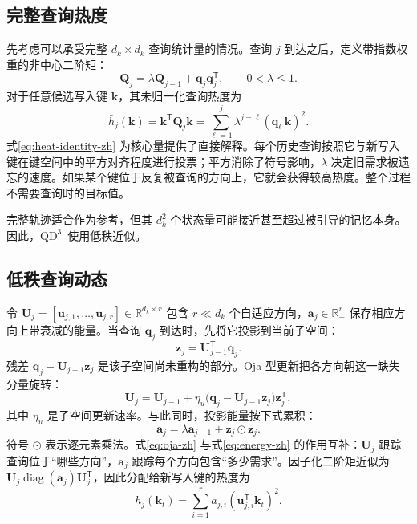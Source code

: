 \documentclass[11pt,a4paper]{ctexart}
\newcommand{\R}{\mathbb{R}}
\newcommand{\Q}{\bm{Q}}
\newcommand{\U}{\bm{U}}
\newcommand{\kvec}{\bm{k}}
\newcommand{\qvec}{\bm{q}}
\newcommand{\avec}{\bm{a}}
\newcommand{\zvec}{\bm{z}}
\newcommand{\diag}{\operatorname{diag}}
\newcommand{\QDDD}{\ensuremath{\mathrm{QD}^{3}}}
\begin{document}
\subsection{完整查询热度}

先考虑可以承受完整 $d_k\times d_k$ 查询统计量的情况。查询 $j$ 到达之后，定义带指数权重的非中心二阶矩：
\begin{equation}
 \Q_j=\lambda\Q_{j-1}+\qvec_j\qvec_j^{\mathsf T},
 \qquad 0<\lambda\leq1.
 \label{eq:full-trace-zh}
\end{equation}
对于任意候选写入键 $\kvec$，其未归一化查询热度为
\begin{equation}
 \bar h_j(\kvec)=\kvec^{\mathsf T}\Q_j\kvec
 =\sum_{\ell=1}^{j}\lambda^{j-\ell}(\qvec_{\ell}^{\mathsf T}\kvec)^2.
 \label{eq:heat-identity-zh}
\end{equation}
式\eqref{eq:heat-identity-zh} 为核心量提供了直接解释。每个历史查询按照它与新写入键在键空间中的平方对齐程度进行投票；平方消除了符号影响，$\lambda$ 决定旧需求被遗忘的速度。如果某个键位于反复被查询的方向上，它就会获得较高热度。整个过程不需要查询时的目标值。

完整轨迹适合作为参考，但其 $d_k^2$ 个状态量可能接近甚至超过被引导的记忆本身。因此，\QDDD\ 使用低秩近似。

\subsection{低秩查询动态}

令 $\U_j=[\bm u_{j,1},\ldots,\bm u_{j,r}]\in\R^{d_k\times r}$ 包含 $r\ll d_k$ 个自适应方向，$\avec_j\in\R_+^r$ 保存相应方向上带衰减的能量。当查询 $\qvec_j$ 到达时，先将它投影到当前子空间：
\begin{equation}
 \zvec_j=\U_{j-1}^{\mathsf T}\qvec_j.
 \label{eq:projection-zh}
\end{equation}
残差 $\qvec_j-\U_{j-1}\zvec_j$ 是该子空间尚未重构的部分。Oja 型更新把各方向朝这一缺失分量旋转：
\begin{equation}
 \U_j=\U_{j-1}+\eta_u
 \bigl(\qvec_j-\U_{j-1}\zvec_j\bigr)\zvec_j^{\mathsf T},
 \label{eq:oja-zh}
\end{equation}
其中 $\eta_u$ 是子空间更新速率。与此同时，投影能量按下式累积：
\begin{equation}
 \avec_j=\lambda\avec_{j-1}+\zvec_j\odot\zvec_j.
 \label{eq:energy-zh}
\end{equation}
符号 $\odot$ 表示逐元素乘法。式\eqref{eq:oja-zh} 与式\eqref{eq:energy-zh} 的作用互补：$\U_j$ 跟踪查询位于“哪些方向”，$\avec_j$ 跟踪每个方向包含“多少需求”。因子化二阶矩近似为 $\U_j\diag(\avec_j)\U_j^{\mathsf T}$，因此分配给新写入键的热度为
\begin{equation}
 \bar h_j(\kvec_t)=
 \sum_{i=1}^{r}a_{j,i}(\bm u_{j,i}^{\mathsf T}\kvec_t)^2.
 \label{eq:lowrank-heat-zh}
\end{equation}
\end{document}
